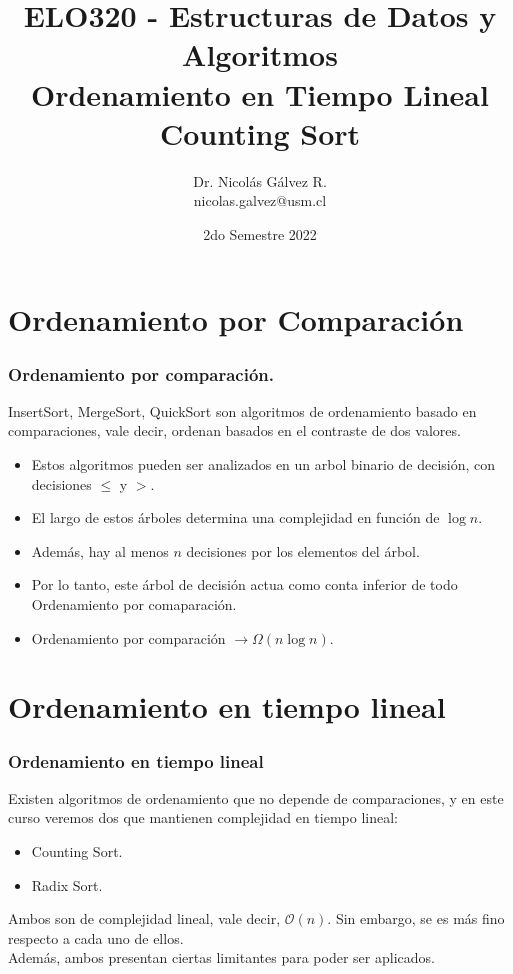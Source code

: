 \documentclass{beamer}
\title{ELO320 - Estructuras de Datos y Algoritmos\\Ordenamiento en Tiempo Lineal\\\small{Counting Sort}}
\author{Dr. Nicolás Gálvez R.\\{\small nicolas.galvez@usm.cl}}
\institute{Ing. Civil Telemática - Departamento de Electrónica}
\date{2do Semestre 2022}
\begin{document}
\frame{\titlepage}

%
%

\section{Ordenamiento por Comparación}
\begin{frame}[fragile]
 \frametitle{Ordenamiento por comparación. }
\small InsertSort, MergeSort, QuickSort son algoritmos de ordenamiento basado en comparaciones, vale decir, ordenan basados en el contraste de dos valores.

\begin{itemize}
\item Estos algoritmos pueden ser analizados en un arbol binario de decisión, con decisiones $\leq$ y $>$. 
\item El largo de estos árboles determina una complejidad en función de $\log n$. 
\item Además, hay al menos $n$ decisiones por los elementos del árbol. 
\item Por lo tanto, este árbol de decisión actua como conta inferior de todo Ordenamiento por comaparación.
\item Ordenamiento por comparación $\rightarrow \Omega(n \log n)$. 
\end{itemize}

\end{frame}

\section{Ordenamiento en tiempo lineal}
\begin{frame}[fragile]
 \frametitle{Ordenamiento en tiempo lineal}
\small Existen algoritmos de ordenamiento que no depende de comparaciones, y en este curso veremos dos que mantienen complejidad en tiempo lineal:
\begin{itemize}
\item Counting Sort.
\item Radix Sort.
\end{itemize}

Ambos son de complejidad lineal, vale decir, $\mathcal{O}(n)$. Sin embargo, se es más fino respecto a cada uno de ellos.\\

Además, ambos presentan ciertas limitantes para poder ser aplicados.
\end{frame}
\end{document}
